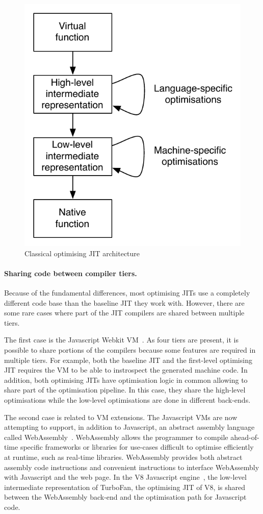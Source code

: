 \documentclass[a4paper,12pt,twoside]{../includes/ThesisStyle}
\begin{document}
\begin{figure}[h!]
    \begin{center}
        \includegraphics[width=0.49\linewidth]{OptJITFig}
        \caption{Classical optimising JIT architecture}
        \label{fig:OptJITFig}
    \end{center}
\end{figure}

\paragraph{Sharing code between compiler tiers.} Because of the fundamental differences, most optimising JITs use a completely different code base than the baseline JIT they work with. However, there are some rare cases where part of the JIT compilers are shared between multiple tiers. 

The first case is the Javascript Webkit VM~\cite{Webkit15}. As four tiers are present, it is possible to share portions of the compilers because some features are required in multiple tiers. For example, both the baseline JIT and the first-level optimising JIT requires the VM to be able to instrospect the generated machine code. In addition, both optimising JITs have optimisation logic in common allowing to share part of the optimisation pipeline. In this case, they share the high-level optimisations while the low-level optimisations are done in different back-ends.

The second case is related to VM extensions. The Javascript VMs are now attempting to support, in addition to Javascript, an abstract assembly language called WebAssembly~\cite{WebAssembly}. WebAssembly allows the programmer to compile ahead-of-time specific frameworks or libraries for use-cases difficult to optimise efficiently at runtime, such as real-time libraries. WebAssembly provides both abstract assembly code instructions and convenient instructions to interface WebAssembly with Javascript and the web page. In the V8 Javascript engine~\cite{V8}, the low-level intermediate representation of TurboFan, the optimising JIT of V8, is shared between the WebAssembly back-end and the optimisation path for Javascript code.
\end{document}
